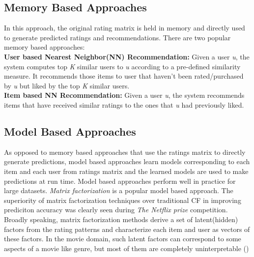 \subsection {Memory Based Approaches}
In this approach, the original rating matrix is held in memory and directly used to generate predicted ratings and recommendations. There are two popular memory based approaches:\\
\textbf{User based Nearest Neighbor(NN) Recommendation:} Given a user \textit{u}, the system computes top \textit{K} similar users to \textit{u} according to a pre-defined similarity measure. It recommends those items to user that haven't been rated/purchased by \textit{u} but liked by the top \textit{K} similar users.\\
\textbf{Item based NN Recommendation:} Given a user \textit{u}, the system recommends items that have received similar ratings to the ones that \textit{u} had previously liked.
 


\subsection {Model Based Approaches}
As opposed to memory based approaches that use the ratings matrix to directly generate predictions, model based approaches learn models corresponding to each item and each user from ratings matrix and the learned models are used to make predictions at run time.
Model based approaches perform well in practice for large datasets.
\textit{Matrix factorization} is a popular model based approach. The superiority of matrix factorization techniques over traditional CF in improving prediciton accuracy was clearly seen during \textit{The Netflix prize} competition.
Broadly speaking, matrix factorization methods derive a set of latent(hidden) factors from the rating patterns and characterize each item and user as vectors of these factors.
In the movie domain, such latent factors can correspond to some aspects of a movie like genre, but most of them are completely uninterpretable (\cite{koren})


